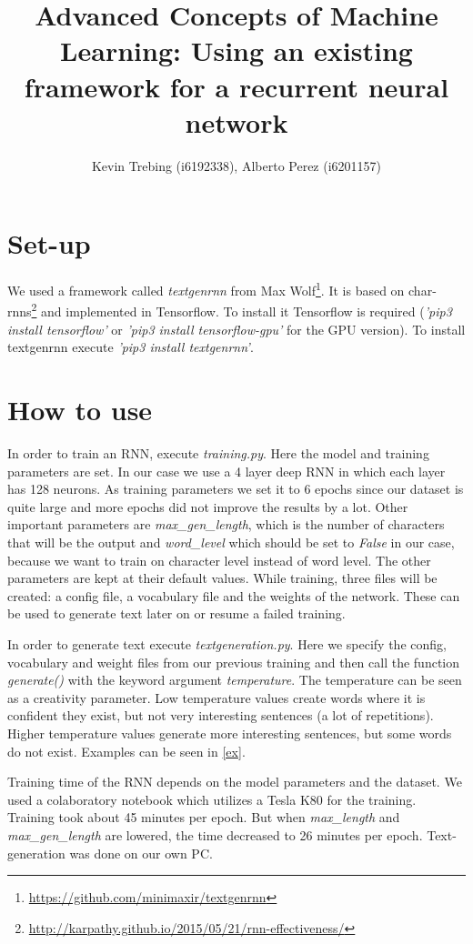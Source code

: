\documentclass[a4paper]{article}
\title{Advanced Concepts of Machine Learning: Using an existing framework for a recurrent neural network}
\author{Kevin Trebing (i6192338), Alberto Perez (i6201157)}
\begin{document}
\maketitle

\section{Set-up}
We used a framework called \textit{textgenrnn} from Max Wolf\footnote{\url{https://github.com/minimaxir/textgenrnn}}. It is based on char-rnns\footnote{\url{http://karpathy.github.io/2015/05/21/rnn-effectiveness/}} and implemented in Tensorflow. To install it Tensorflow is required (\textit{'pip3 install tensorflow'} or \textit{'pip3 install tensorflow-gpu'} for the GPU version). To install textgenrnn execute \textit{'pip3 install textgenrnn'}.

\section{How to use}
In order to train an RNN, execute \textit{training.py}. Here the model and training parameters are set. In our case we use a 4 layer deep RNN in which each layer has 128 neurons. As training parameters we set it to 6 epochs since our dataset is quite large and more epochs did not improve the results by a lot.
Other important parameters are \textit{max\_gen\_length}, which is the number of characters that will be the output and \textit{word\_level} which should be set to \textit{False} in our case, because we want to train on character level instead of word level. The other parameters are kept at their default values. While training, three files will be created: a config file, a vocabulary file and the weights of the network. These can be used to generate text later on or resume a failed training.

In order to generate text execute \textit{textgeneration.py}. Here we specify the config, vocabulary and weight files from our previous training and then call the function \textit{generate()} with the keyword argument \textit{temperature}. The temperature can be seen as a creativity parameter. Low temperature values create words where it is confident they exist, but not very interesting sentences (a lot of repetitions). Higher temperature values generate more interesting sentences, but some words do not exist. Examples can be seen in \ref{ex}.

Training time of the RNN depends on the model parameters and the dataset. We used a colaboratory notebook which utilizes a Tesla K80 for the training. Training took about 45 minutes per epoch. But when \textit{max\_length} and \textit{max\_gen\_length} are lowered, the time decreased to 26 minutes per epoch. Text-generation was done on our own PC.
\end{document}
